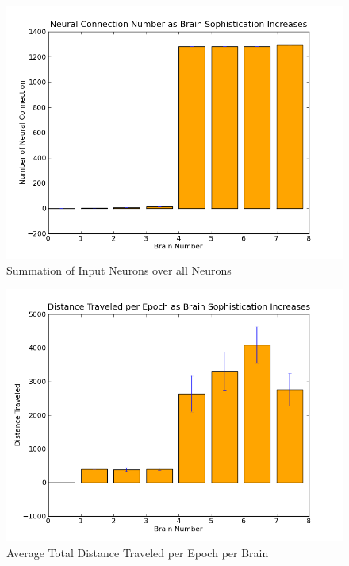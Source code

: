 \documentclass[a4paper,11pt]{article}
\begin{document}
\begin{figure}
\begin{center}
  \includegraphics[scale=1.0]{img/connectionBar-0.0-0.0-0.0-0.0-0.0-0.0-0.0-0.0.png}
  \caption{Summation of Input Neurons over all Neurons }
  \label{fig:connectionbar}
\end{center}
\end{figure}

\begin{figure}
\begin{center}
  \includegraphics[scale=1.0]{img/distanceBar-0.0-0.0-56.89-38.55-531.39-563.6-534.63-481.99.png}
  \caption{Average Total Distance Traveled per Epoch per Brain }
  \label{fig:distancebar}
\end{center}
\end{figure}
\end{document}
